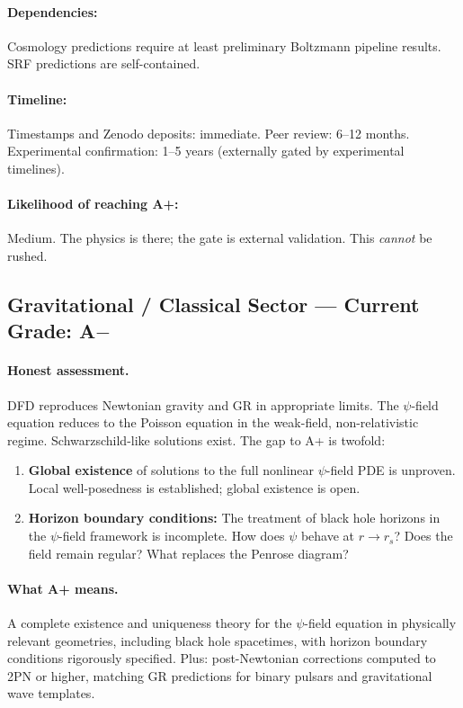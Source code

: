 \documentclass[11pt,a4paper]{article}
\begin{document}
\paragraph{Dependencies:} Cosmology predictions require at least preliminary Boltzmann pipeline results. SRF predictions are self-contained.

\paragraph{Timeline:} Timestamps and Zenodo deposits: immediate. Peer review: 6--12 months. Experimental confirmation: 1--5 years (externally gated by experimental timelines).

\paragraph{Likelihood of reaching A+:} \textcolor{gradeBplus}{Medium}. The physics is there; the gate is external validation. This \emph{cannot} be rushed.

\subsection{Gravitational / Classical Sector --- Current Grade: A$-$}

\paragraph{Honest assessment.}
DFD reproduces Newtonian gravity and GR in appropriate limits. The $\psi$-field equation reduces to the Poisson equation in the weak-field, non-relativistic regime. Schwarzschild-like solutions exist. The gap to A+ is twofold:
\begin{enumerate}[label=(\alph*)]
    \item \textbf{Global existence} of solutions to the full nonlinear $\psi$-field PDE is unproven. Local well-posedness is established; global existence is open.
    \item \textbf{Horizon boundary conditions:} The treatment of black hole horizons in the $\psi$-field framework is incomplete. How does $\psi$ behave at $r \to r_s$? Does the field remain regular? What replaces the Penrose diagram?
\end{enumerate}

\paragraph{What A+ means.}
A complete existence and uniqueness theory for the $\psi$-field equation in physically relevant geometries, including black hole spacetimes, with horizon boundary conditions rigorously specified. Plus: post-Newtonian corrections computed to 2PN or higher, matching GR predictions for binary pulsars and gravitational wave templates.
\end{document}

